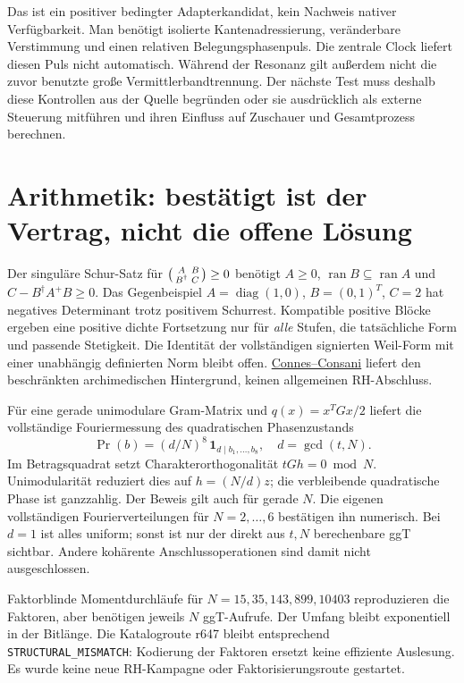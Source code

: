 Das ist ein positiver bedingter Adapterkandidat, kein Nachweis nativer Verfügbarkeit. Man benötigt isolierte Kantenadressierung, veränderbare Verstimmung und einen relativen Belegungsphasenpuls. Die zentrale Clock liefert diesen Puls nicht automatisch. Während der Resonanz gilt außerdem nicht die zuvor benutzte große Vermittlerbandtrennung. Der nächste Test muss deshalb diese Kontrollen aus der Quelle begründen oder sie ausdrücklich als externe Steuerung mitführen und ihren Einfluss auf Zuschauer und Gesamtprozess berechnen.

\section{Arithmetik: bestätigt ist der Vertrag, nicht die offene Lösung}
Der singuläre Schur-Satz für $\begin{psmallmatrix}A&B\\B^\dagger&C\end{psmallmatrix}\ge0$ benötigt $A\ge0$, $\operatorname{ran}B\subseteq\operatorname{ran}A$ und $C-B^\dagger A^+B\ge0$. Das Gegenbeispiel $A=\operatorname{diag}(1,0)$, $B=(0,1)^T$, $C=2$ hat negatives Determinant trotz positivem Schurrest. Kompatible positive Blöcke ergeben eine positive dichte Fortsetzung nur für \emph{alle} Stufen, die tatsächliche Form und passende Stetigkeit. Die Identität der vollständigen signierten Weil-Form mit einer unabhängig definierten Norm bleibt offen. \href{https://arxiv.org/abs/2006.13771}{Connes--Consani} liefert den beschränkten archimedischen Hintergrund, keinen allgemeinen RH-Abschluss.

Für eine gerade unimodulare Gram-Matrix und $q(x)=x^TGx/2$ liefert die vollständige Fouriermessung des quadratischen Phasenzustands
\begin{equation}
\Pr(b)=(d/N)^8\,\mathbf1_{d\mid b_1,\ldots,b_8},\quad d=\gcd(t,N).
\end{equation}
Im Betragsquadrat setzt Charakterorthogonalität $tGh=0\bmod N$. Unimodularität reduziert dies auf $h=(N/d)z$; die verbleibende quadratische Phase ist ganzzahlig. Der Beweis gilt auch für gerade $N$. Die eigenen vollständigen Fourierverteilungen für $N=2,\ldots,6$ bestätigen ihn numerisch. Bei $d=1$ ist alles uniform; sonst ist nur der direkt aus $t,N$ berechenbare ggT sichtbar. Andere kohärente Anschlussoperationen sind damit nicht ausgeschlossen.

Faktorblinde Momentdurchläufe für $N=15,35,143,899,10403$ reproduzieren die Faktoren, aber benötigen jeweils $N$ ggT-Aufrufe. Der Umfang bleibt exponentiell in der Bitlänge. Die Katalogroute r647 bleibt entsprechend \texttt{STRUCTURAL\_MISMATCH}: Kodierung der Faktoren ersetzt keine effiziente Auslesung. Es wurde keine neue RH-Kampagne oder Faktorisierungsroute gestartet.

